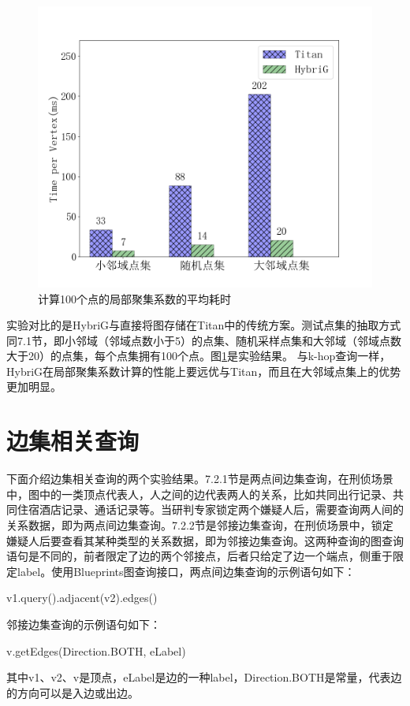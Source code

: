 \begin{figure}[htbp]
\centering
\includegraphics[width=120mm]{fig/local_cc.png}
\caption{计算100个点的局部聚集系数的平均耗时}
\label{fig:local_cc}
\end{figure}

实验对比的是HybriG与直接将图存储在Titan中的传统方案。测试点集的抽取方式同7.1节，即小邻域（邻域点数小于5）的点集、随机采样点集和大邻域（邻域点数大于20）的点集，每个点集拥有100个点。图\ref{fig:local_cc}是实验结果。
与k-hop查询一样，HybriG在局部聚集系数计算的性能上要远优与Titan，而且在大邻域点集上的优势更加明显。

\section{边集相关查询}
下面介绍边集相关查询的两个实验结果。7.2.1节是两点间边集查询，在刑侦场景中，图中的一类顶点代表人，人之间的边代表两人的关系，比如共同出行记录、共同住宿酒店记录、通话记录等。当研判专家锁定两个嫌疑人后，需要查询两人间的关系数据，即为两点间边集查询。7.2.2节是邻接边集查询，在刑侦场景中，锁定嫌疑人后要查看其某种类型的关系数据，即为邻接边集查询。这两种查询的图查询语句是不同的，前者限定了边的两个邻接点，后者只给定了边一个端点，侧重于限定label。使用Blueprints图查询接口，两点间边集查询的示例语句如下：
\begin{center}
  v1.query().adjacent(v2).edges()
\end{center}
邻接边集查询的示例语句如下：
\begin{center}
  v.getEdges(Direction.BOTH, eLabel)
\end{center}
其中v1、v2、v是顶点，eLabel是边的一种label，Direction.BOTH是常量，代表边的方向可以是入边或出边。
